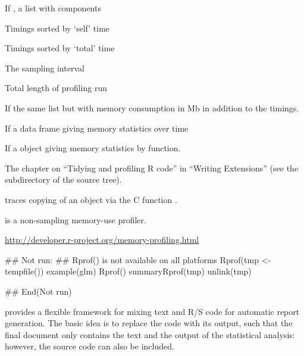 %
\begin{Value}
If , a list with components
\begin{ldescription}
\item[\code{by.self}] Timings sorted by `self' time
\item[\code{by.total}] Timings sorted by `total' time
\item[\code{sample.interval}] The sampling interval
\item[\code{sampling.time}] Total length of profiling run

\end{ldescription}
If  the same list but with memory consumption in Mb
in addition to the timings.  

If  a data frame giving memory statistics over
time

If  a  object giving memory statistics
by function.
\end{Value}
%
\begin{SeeAlso}\relax
The chapter on ``Tidying and profiling R code'' in
``Writing \R{} Extensions'' (see the  subdirectory
of the \R{} source tree).


 traces copying of an object via the C function
.

 is a non-sampling memory-use profiler.

\url{http://developer.r-project.org/memory-profiling.html}
\end{SeeAlso}
%
\begin{Examples}
\begin{ExampleCode}
## Not run: 
## Rprof() is not available on all platforms
Rprof(tmp <- tempfile())
example(glm)
Rprof()
summaryRprof(tmp)
unlink(tmp)

## End(Not run)
\end{ExampleCode}
\end{Examples}
%
\begin{Description}\relax
{} provides a flexible framework for mixing text and R/S code
for automatic report generation.  The basic idea is to replace the
code with its output, such that the final document only contains the
text and the output of the statistical analysis: however, the source
code can also be included.
\end{Description}
